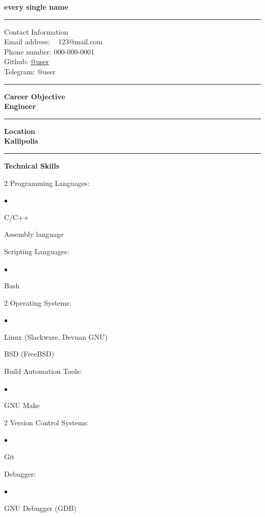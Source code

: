 \documentclass[oneside,final,12pt]{extreport}
\newenvironment{compactlist}{
	\begin{list}{{$\bullet$}}{
		\setlength\leftmargin{0.4cm}
		\setlength\partopsep{0pt}
		\setlength\parskip{0pt}
		\setlength\parsep{0pt}
		\setlength\topsep{0pt}
		\setlength\itemsep{0pt}
	}
}{
	\end{list}
}
\begin{document}
\bfseries
every single name\\
\rule{\textwidth}{0.4pt}
Contact Information \\
\noindent
\mdseries
Email address: \
123@mail.com \\
Phone number:
000-000-0001 \\
Github: 
\href{https://github.com/user}{@user} \\
Telegram:
@user \\
\rule{\textwidth}{0.4pt}

\bfseries
Career Objective \\
\mdseries
Engineer\\
\rule{\textwidth}{0.4pt}

\bfseries
Location \\
\mdseries
Kallipolis \\
\rule{\textwidth}{0.4pt}

\bfseries
Technical Skills
\mdseries
\begin{multicols}{2}
Programming Languages:
	\begin{compactlist}
		\item C/C++
		\item Assembly language
	\end{compactlist}
		Scripting Languages:
	\begin{compactlist}
		\item Bash
	\end{compactlist}
\end{multicols}

\begin{multicols}{2}
Operating Systems:
	\begin{compactlist}
		\item Linux (Slackware, Devuan GNU)
		\item *BSD (FreeBSD)
	\end{compactlist}
Build Automation Tools:
	\begin{compactlist}
		\item GNU Make
	\end{compactlist}
\end{multicols}

\begin{multicols}{2}
Version Control Systems:
	\begin{compactlist}
		\item Git
	\end{compactlist}
	Debugger:
	\begin{compactlist}
		 \item GNU Debugger (GDB)
	\end{compactlist}
\end{multicols}
\end{document}

